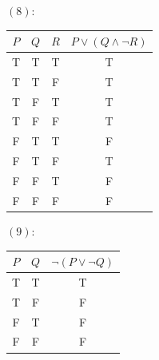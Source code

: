 \begin{solution}
    $(8)$:
    \begin{table}[H]
        \centering
        \begin{tabular}{cccc}
            \toprule
            $P$ & $Q$ & $R$ & $P\lor(Q\land\neg R)$\\
            \midrule
            T & T & T & T\\
            T & T & F & T\\
            T & F & T & T\\
            T & F & F & T\\
            F & T & T & F\\
            F & T & F & T\\
            F & F & T & F\\
            F & F & F & F\\
            \bottomrule
        \end{tabular}
    \end{table}

    $(9)$:
        \begin{table}[H]
        \centering
        \begin{tabular}{ccc}
            \toprule
            $P$ & $Q$ & $\neg(P\lor\neg Q)$\\
            \midrule
            T & T & T\\
            T & F & F\\
            F & T & F\\
            F & F & F\\
            \bottomrule
        \end{tabular}
    \end{table}    
\end{solution}

